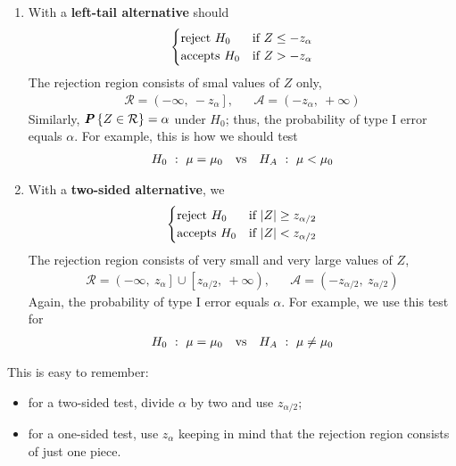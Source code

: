\begin{enumerate}[label=(\alph*)]
  \item With a \textbf{left-tail alternative} should
    \begin{equation}
      \begin{cases}
        \textnormal{reject } H_0 &\textnormal{if } Z \leq -z_{\alpha}\\
        \textnormal{accepts } H_0 &\textnormal{if } Z > -z_{\alpha}\\
      \end{cases}
    \end{equation}
    The rejection region consists of smal values of $Z$ only,
    \begin{align*}
      \mathcal{R} = \left( -\infty,\ -z_{\alpha} \right], & &\mathcal{A} = \left( -z_{\alpha},\ +\infty \right)
    \end{align*}
    Similarly, $\textbf{\textit{P}}\left\{Z \in \mathcal{R}\right\} = \alpha$ under $H_0$; thus, the probability of type I error equals $\alpha$. For example, this is how we should test
    \begin{align*}
      H_0\ :\ \mu = \mu_0 &&\textnormal{vs}&& H_A\ :\ \mu < \mu_0
    \end{align*}

  \item With a \textbf{two-sided alternative}, we
    \begin{equation}
      \begin{cases}
        \textnormal{reject } H_0 &\textnormal{if } |Z| \geq z_{\alpha/2}\\
        \textnormal{accepts } H_0 &\textnormal{if } |Z| < z_{\alpha/2}\\
      \end{cases}
    \end{equation}
    The rejection region consists of very small and very large values of $Z$,
    \begin{align*}
      \mathcal{R} = \left( -\infty,\ z_{\alpha} \right] \cup \left[ z_{\alpha/2},\ +\infty \right), & &\mathcal{A} = \left( -z_{\alpha/2},\ z_{\alpha/2} \right)
    \end{align*}
    Again, the probability of type I error equals $\alpha$. For example, we use this test for
    \begin{align*}
      H_0\ :\ \mu = \mu_0 &&\textnormal{vs}&& H_A\ :\ \mu \neq \mu_0
    \end{align*}
\end{enumerate}

This is easy to remember:
\begin{itemize}
  \item for a two-sided test, divide $\alpha$ by two and use $z_{\alpha/2}$;
  \item for a one-sided test, use $z_{\alpha}$ keeping in mind that the rejection region consists of just one piece.
\end{itemize}

